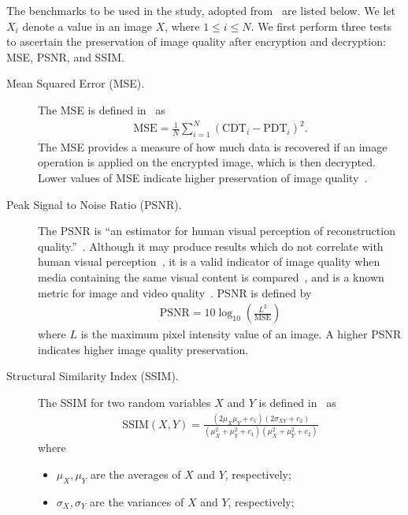 The benchmarks to be used in the study, adopted from~\cite{ahmed_benchmark_2016, ahmad_efficiency_2012, wu_npcr_2011} are listed below. We let $X_i$ denote a value in an image $X$, where $1 \leq i \leq N$.
We first perform three tests to ascertain the preservation of image quality after encryption and decryption: MSE, PSNR, and SSIM.
\begin{description}
	\item [Mean Squared Error (MSE).] The MSE is defined in~\cite{ahmed_benchmark_2016} as
	\begin{align}
        \mathrm{MSE} = \frac{1}{N}\sum_{i=1}^{N}{(\mathrm{CDT}_i - \mathrm{PDT}_i)^2}.
	\end{align}
	The MSE provides a measure of how much data is recovered if an image operation is applied on the encrypted image, which is then decrypted. Lower values of MSE indicate higher preservation of image quality~\cite{ahmed_benchmark_2016, ahmad_efficiency_2012}.
	\item [Peak Signal to Noise Ratio (PSNR).]
	The PSNR is ``an estimator for human visual perception of reconstruction quality.''~\cite{ahmed_benchmark_2016}. Although it may produce results which do not correlate with human visual perception~\cite{huynh-thu_accuracy_2012, ahmed_benchmark_2016}, it is a valid indicator of image quality when media containing the same visual content is compared~\cite{huynh-thu_accuracy_2012}, and is a known metric for image and video quality~\cite{upmanyu_efficient_2009, jain_image_2016, akramullah_video_2014}.
	PSNR is defined by
	\begin{align}
        \mathrm{PSNR} = 10\log_{10}{\left( \frac{L^2}{\mathrm{MSE}} \right)}
	\end{align}
	where $L$ is the maximum pixel intensity value of an image. A higher PSNR indicates higher image quality preservation.
	\item [Structural Similarity Index (SSIM).]
	The SSIM for two random variables $X$ and $Y$ is defined in~\cite{ahmed_benchmark_2016, akramullah_video_2014} as
	\begin{align}
        \mathrm{SSIM}(X,Y) = \frac{(2\mu_X\mu_Y+c_1)(2\sigma_{XY}+c_2)}{(\mu_X^2+\mu_Y^2+c_1)(\mu_X^2+\mu_Y^2+c_2)}
	\end{align}
	where
	\begin{itemize}
		\item $\mu_X, \mu_Y$ are the averages of $X$ and $Y$, respectively;
		\item $\sigma_X, \sigma_Y$ are the variances of $X$ and $Y$, respectively;

\end{itemize}
\end{description}
